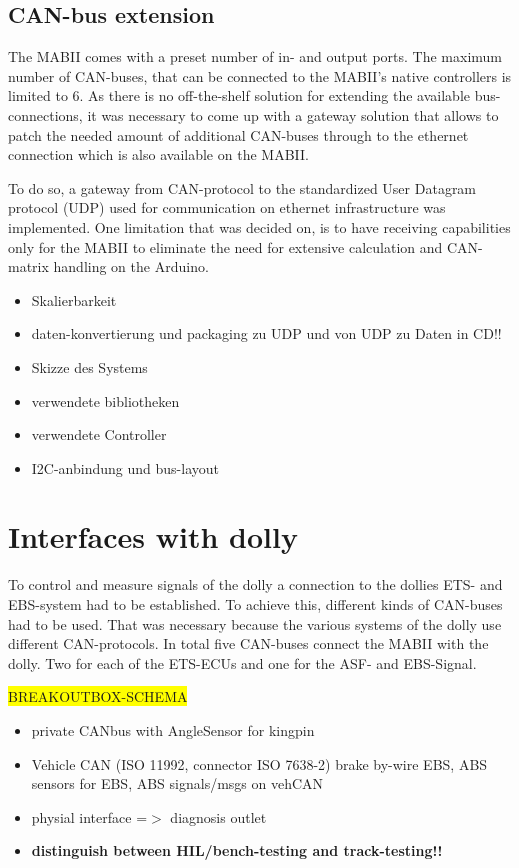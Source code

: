 \documentclass[ExampleMasters.tex]{subfiles}
\begin{document}
\subsection{CAN-bus extension}

The MABII comes with a preset number of in- and output ports. The maximum number of CAN-buses, that can be connected to the MABII's native controllers is limited to 6. As there is no off-the-shelf solution for extending the available bus-connections, it was necessary to come up with a gateway solution that allows to patch the needed amount of additional CAN-buses through to the ethernet connection which is also available on the MABII. 

To do so, a gateway from CAN-protocol to the standardized User Datagram protocol (UDP) used for communication on ethernet  infrastructure was implemented. One limitation that was decided on, is to have receiving capabilities only for the MABII to eliminate the need for extensive calculation and CAN-matrix handling on the Arduino.


\begin{itemize}
	\item Skalierbarkeit
	\item daten-konvertierung und packaging zu UDP und von UDP zu Daten in CD!!
	\item Skizze des Systems
	\item verwendete bibliotheken
	\item verwendete Controller
	\item I2C-anbindung und bus-layout
\end{itemize}

\section{Interfaces with dolly}
\label{sec:interface_with_dolly}
To control and measure signals of the dolly a connection to the dollies ETS- and EBS-system had to be established. To achieve this, different kinds of CAN-buses had to be used. That was necessary because the various systems of the dolly use different CAN-protocols. In total five CAN-buses connect the MABII with the dolly. Two for each of the ETS-ECUs and one for the ASF- and EBS-Signal.

\colorbox{yellow}{BREAKOUTBOX-SCHEMA}
 
\begin{itemize}
	\item private CANbus with AngleSensor for kingpin
	\item Vehicle CAN (ISO 11992, connector ISO 7638-2)
	\subitem brake by-wire
	\subitem EBS, ABS
	\subitem sensors for EBS, ABS
	\subitem signals/msgs on vehCAN
	\item physial interface =$>$ diagnosis outlet
	\item \textbf{distinguish between HIL/bench-testing and track-testing!!}
\end{itemize}
\end{document}
